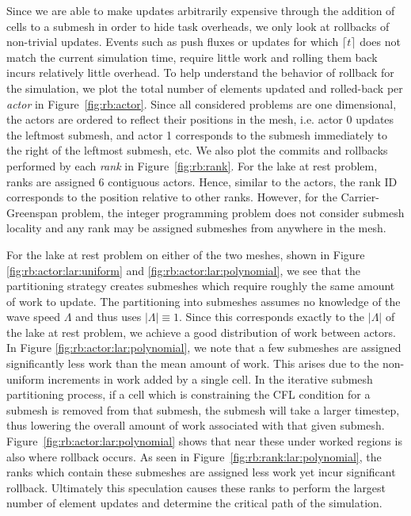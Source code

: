 \documentclass[10pt,letterpaper]{article}
\begin{document}
Since we are able to make updates arbitrarily expensive through the addition of cells to a submesh in order to hide task overheads, we only look at rollbacks of non-trivial updates. Events such as push fluxes or updates for which $\lceil t \rceil$ does not match the current simulation time, require little work and rolling them back incurs relatively little overhead.
To help understand the behavior of rollback for the simulation, we plot the total number of elements updated and rolled-back per {\em actor} in Figure~\ref{fig:rb:actor}. Since all considered problems are one dimensional, the actors are ordered to reflect their positions in the mesh, i.e. actor 0 updates the leftmost submesh, and actor 1 corresponds to the submesh immediately to the right of the leftmost submesh, etc.
We also plot the commits and rollbacks performed by each {\em rank} in Figure~\ref{fig:rb:rank}. For the lake at rest problem, ranks are assigned 6 contiguous actors. Hence, similar to the actors, the rank ID corresponds to the position relative to other ranks. However, for the Carrier-Greenspan problem, the integer programming problem does not consider submesh locality and any rank may be assigned submeshes from anywhere in the mesh.


 For the lake at rest problem on either of the two meshes, shown in Figure \ref{fig:rb:actor:lar:uniform} and \ref{fig:rb:actor:lar:polynomial}, we see that the partitioning strategy creates submeshes which require roughly the same amount of work to update. The partitioning into submeshes assumes no knowledge of the wave speed $\Lambda$ and thus uses $|\Lambda|\equiv 1$. Since this corresponds exactly to the $|\Lambda|$ of the lake at rest problem, we achieve a good distribution of work between actors. In Figure \ref{fig:rb:actor:lar:polynomial}, we note that a few submeshes are assigned significantly less work than the mean amount of work. This arises due to the non-uniform increments in work added by a single cell. In the iterative submesh partitioning process, if a cell which is constraining the CFL condition for a submesh is removed from that submesh, the submesh will take a larger timestep, thus lowering the overall amount of work associated with that given submesh. Figure~\ref{fig:rb:actor:lar:polynomial} shows that near these under worked regions is also where rollback occurs. As seen in Figure~\ref{fig:rb:rank:lar:polynomial}, the ranks which contain these submeshes are assigned less work yet incur significant rollback. Ultimately this speculation causes these ranks to perform the largest number of element updates and determine the critical path of the simulation.
 
\end{document}
